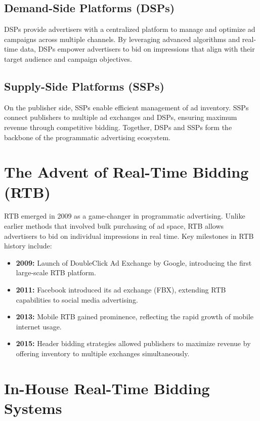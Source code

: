 \documentclass[../main.tex]{subfiles}
\begin{document}
	\subsection*{Demand-Side Platforms (DSPs)}
	
	DSPs provide advertisers with a centralized platform to manage and optimize ad campaigns across multiple channels. By leveraging advanced algorithms and real-time data, DSPs empower advertisers to bid on impressions that align with their target audience and campaign objectives.
	
	\subsection*{Supply-Side Platforms (SSPs)}
	
	On the publisher side, SSPs enable efficient management of ad inventory. SSPs connect publishers to multiple ad exchanges and DSPs, ensuring maximum revenue through competitive bidding. Together, DSPs and SSPs form the backbone of the programmatic advertising ecosystem.
	
	\section*{The Advent of Real-Time Bidding (RTB)}
	
	RTB emerged in 2009 as a game-changer in programmatic advertising. Unlike earlier methods that involved bulk purchasing of ad space, RTB allows advertisers to bid on individual impressions in real time. Key milestones in RTB history include:
	
	\begin{itemize}
		\item \textbf{2009:} Launch of DoubleClick Ad Exchange by Google, introducing the first large-scale RTB platform.
		\item \textbf{2011:} Facebook introduced its ad exchange (FBX), extending RTB capabilities to social media advertising.
		\item \textbf{2013:} Mobile RTB gained prominence, reflecting the rapid growth of mobile internet usage.
		\item \textbf{2015:} Header bidding strategies allowed publishers to maximize revenue by offering inventory to multiple exchanges simultaneously.
	\end{itemize}
	
	\section*{In-House Real-Time Bidding Systems}
	
\end{document}
